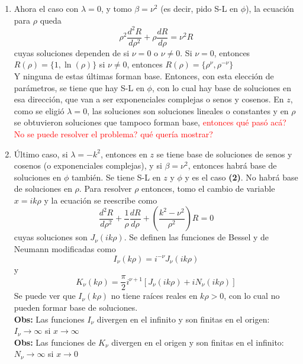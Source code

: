 \begin{enumerate}
    \item Ahora el caso con $\lambda = 0$, y tomo $\beta = \nu^{2}$ (es decir, pido S-L en $\phi$), la ecuación para $\rho$ queda
    \begin{equation*}
        \rho^{2}\frac{d^{2}R}{d\rho^{2}} + \rho\frac{dR}{d\rho} = \nu^{2}R
    \end{equation*}
    cuyas soluciones dependen de si $\nu = 0$ o $\nu \neq 0$.
        \subitem Si $\nu = 0$, entonces $R(\rho) = \{1, \ln{(\rho)} \}$
        \subitem si $\nu \neq 0 $, entonces $R(\rho) = \{\rho^{\nu}, \rho^{-\nu}\}$\\
    Y ninguna de estas últimas forman base. Entonces, con esta elección de parámetros, se tiene que hay S-L en $\phi$, con lo cual hay base de soluciones en esa dirección, que van a ser exponenciales complejas o senos y cosenos. En $z$, como se eligió $\lambda = 0$, las soluciones son soluciones lineales o constantes y en $\rho$ se obtuvieron soluciones que tampoco forman base, \textcolor{red}{entonces qué pasó acá? No se puede resolver el problema? qué quería mostrar?}
    \item Último caso, si $\lambda = -k^{2}$, entonces en $z$ se tiene base de soluciones de senos y cosenos (o exponenciales complejas), y si $\beta = \nu^{2}$, entonces habrá base de soluciones en $\phi$ también. Se tiene S-L en $z$ y $\phi$ y es el caso \textbf{(2)}. No habrá base de soluciones en $\rho$. Para resolver $\rho$ entonces, tomo el cambio de variable $x = ik\rho$ y la ecuación se reescribe como
    \begin{equation*}
        \frac{d^{2}R}{d\rho^{2}} 
        + 
        \frac{1}{\rho}\frac{dR}{d\rho}
        +
        \left(
            \frac{k^{2} -\nu^{2}}{\rho^{2}} 
        \right)R = 0
    \end{equation*}
    cuyas soluciones son $J_{\nu}(ik\rho)$. Se definen las funciones de Bessel y de Neumann modificadas como
    \begin{equation*}
        I_{\nu}(k\rho) = i^{-\nu}J_{\nu}(ik\rho)
    \end{equation*}
    y
    \begin{equation*}
        K_{\nu}(k\rho) = \frac{\pi}{2}i^{\nu+1}
        \left[
            J_{\nu}(ik\rho) +iN_{\nu}(ik\rho)
        \right]
    \end{equation*}
    Se puede ver que $I_{\nu}(k\rho)$ no tiene raíces reales en $k\rho > 0$, con lo cual no pueden formar base de soluciones. \\
    \textbf{Obs:} Las funciones $I_{\nu}$ divergen en el infinito y son finitas en el origen: $I_{\nu}\to\infty$ si $x \to \infty$\\
    \textbf{Obs:} Las funciones de $K_{\nu}$ divergen en el origen y son finitas en el infinito: $N_{\nu}\to \infty$ si $x \to 0$\\
\end{enumerate}
